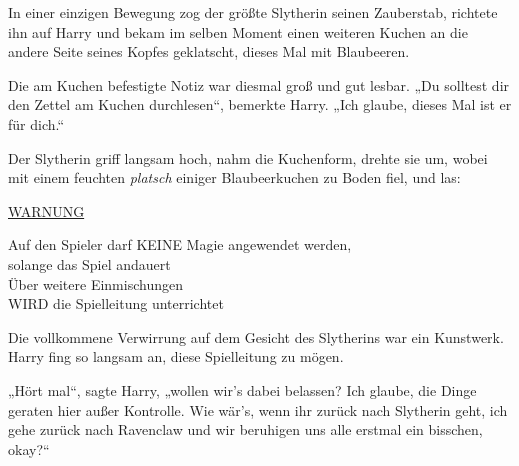 In einer einzigen Bewegung zog der größte Slytherin seinen Zauberstab, richtete ihn auf Harry und bekam im selben Moment einen weiteren Kuchen an die andere Seite seines Kopfes geklatscht, dieses Mal mit Blaubeeren.

Die am Kuchen befestigte Notiz war diesmal groß und gut lesbar.
„Du solltest dir den Zettel am Kuchen durchlesen“, bemerkte Harry.
„Ich glaube, dieses Mal ist er für dich.“

Der Slytherin griff langsam hoch, nahm die Kuchenform, drehte sie um, wobei mit einem feuchten \emph{platsch} einiger Blaubeerkuchen zu Boden fiel, und las:
\begin{writtenNote}
\MakeUppercase{\underline{Warnung}}

Auf den Spieler darf \MakeUppercase{keine} Magie angewendet werden,\\
solange das Spiel andauert\\
Über weitere Einmischungen\\
\MakeUppercase{wird} die Spielleitung unterrichtet
\end{writtenNote}

Die vollkommene Verwirrung auf dem Gesicht des Slytherins war ein Kunstwerk. Harry fing so langsam an, diese Spielleitung zu mögen.

„Hört mal“, sagte Harry, „wollen wir’s dabei belassen? Ich glaube, die Dinge geraten hier außer Kontrolle. Wie wär’s, wenn ihr zurück nach Slytherin geht, ich gehe zurück nach Ravenclaw und wir beruhigen uns alle erstmal ein bisschen, okay?“

